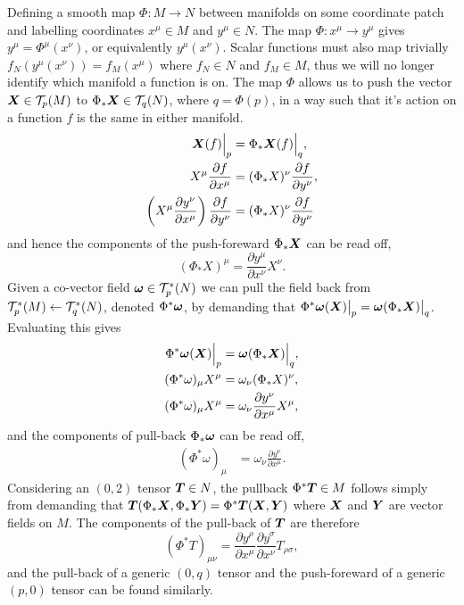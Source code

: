 Defining a smooth map $\Phi : M \rightarrow N$ between manifolds on some coordinate patch and labelling coordinates $x^\mu\in M$ and $y^\mu\in N$. The map $\Phi:x^\mu \rightarrow y^\mu$ gives $y^\mu = \Phi^\mu(x^\nu)$, or equivalently $y^\mu(x^\nu)$. Scalar functions must also map trivially $f_N(y^\mu(x^\nu))=f_M(x^\mu)$ where $f_N\in N$ and $f_M \in M$, thus we will no longer identify which manifold a function is on. The map $\Phi$ allows us to push the vector $\boldsymbol{X}\in\mathcal{T}_p(M)$ to $\Phi_* \boldsymbol{X} \in \mathcal{T}_q(N)$, where $q=\Phi(p)$, in a way such that it's action on a function $f$ is the same in either manifold. 
\begin{align}
\boldsymbol{X}(f)\Big|_p &= \Phi_*\boldsymbol{X}(f)\Big|_q ,\\
X^\mu \frac{\partial f}{\partial x^\mu}  &= (\Phi_* X)^\nu\frac{\partial f}{\partial y^\nu} , \\
\left( X^\mu \frac{\partial y^\nu}{\partial x^\mu}\right) \frac{\partial f}{\partial y^\nu}  &= (\Phi_* X)^\nu\frac{\partial f}{\partial y^\nu}
\end{align} 
and hence the components of the push-foreward $\Phi_* \boldsymbol{X}$ can be read off,
\begin{equation}
(\Phi_* X)^\mu = \frac{\partial y^\mu}{\partial x^\nu}X^\nu.
\end{equation}
Given a co-vector field $\boldsymbol{\omega} \in \mathcal{T}^*_p(N)$ we can pull the field back from $\mathcal{T}^*_p(M) \leftarrow \mathcal{T}^*_q(N)$, denoted $\Phi^*\boldsymbol{\omega}$, by demanding that $\Phi^*\boldsymbol{\omega}(\boldsymbol{X})\big|_p = \boldsymbol{\omega}(\Phi_* \boldsymbol{X})\big|_q$. Evaluating this gives 
\begin{align}
\Phi^*\boldsymbol{\omega}(\boldsymbol{X})\Big|_p &= \boldsymbol{\omega}(\Phi_* \boldsymbol{X})\Big|_q, \\
(\Phi^* \omega)_\mu X^\mu&= \omega_\nu (\Phi_*X)^\nu , \\ 
(\Phi^* \omega)_\mu X^\mu&= \omega_\nu \frac{\partial y^\nu}{\partial x^\mu} X^\mu ,
\end{align}
and the components of pull-back $\Phi_*\boldsymbol{\omega}$ can be read off,
\begin{align}
(\Phi^* \omega)_\mu &= \omega_\nu \frac{\partial y^\nu}{\partial x^\mu}.
\end{align}
Considering an $(0,2)$ tensor $\boldsymbol{T} \in N$, the pullback $\Phi^*\boldsymbol{T} \in M$ follows simply from demanding that $\boldsymbol{T}(\Phi_* \boldsymbol{X},\Phi_*\boldsymbol{Y}) = \Phi^*\boldsymbol{T}(\boldsymbol{X},\boldsymbol{Y})$ where $\boldsymbol{X}$ and $\boldsymbol{Y}$ are vector fields on $M$. The components of the pull-back of $\boldsymbol{T}$ are therefore
\begin{equation}
(\Phi^*T)_{\mu\nu} = \frac{\partial y^\rho}{\partial x^\mu} \frac{\partial y^\sigma}{\partial x^\nu}T_{\rho\sigma},
\end{equation}
and the pull-back of a generic $(0,q)$ tensor and the push-foreward of a generic $(p,0)$ tensor can be found similarly.

